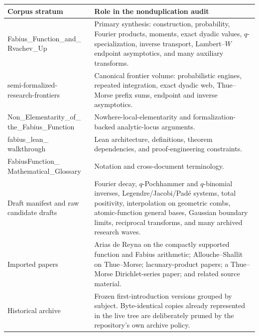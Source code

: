 \documentclass[11pt]{article}
\numberwithin{equation}{section}
\theoremstyle{definition}
\begin{document}
\begin{longtable}{@{}p{}p{}@{}}
\toprule
Corpus stratum & Role in the nonduplication audit\\
\midrule
\endhead
\shortstack[l]{\ttfamily\footnotesize Fabius\_Function\_and\_\\\ttfamily\footnotesize Rvachev\_Up} & Primary synthesis: construction, probability, Fourier products, moments, exact dyadic values, \(q\)-specialization, inverse transport, Lambert--\(W\) endpoint asymptotics, and many auxiliary transforms.\\
\shortstack[l]{\ttfamily\footnotesize semi-formalized-\\\ttfamily\footnotesize research-frontiers} & Canonical frontier volume: probabilistic engines, repeated integration, exact dyadic web, Thue--Morse prefix sums, endpoint and inverse asymptotics.\\
\shortstack[l]{\ttfamily\footnotesize Non\_Elementarity\_of\_\\\ttfamily\footnotesize the\_Fabius\_Function} & Nowhere-local-elementarity and formalization-backed analytic-locus arguments.\\
\shortstack[l]{\ttfamily\footnotesize fabius\_lean\_\\\ttfamily\footnotesize walkthrough} & Lean architecture, definitions, theorem dependencies, and proof-engineering constraints.\\
\shortstack[l]{\ttfamily\footnotesize FabiusFunction\_\\\ttfamily\footnotesize Mathematical\_Glossary} & Notation and cross-document terminology.\\
Draft manifest and raw candidate drafts & Fourier decay, \(q\)-Pochhammer and \(q\)-binomial inverses, Legendre/Jacobi/Pad\'e systems, total positivity, interpolation on geometric combs, atomic-function general bases, Gaussian boundary limits, reciprocal transforms, and many archived research waves.\\
Imported papers & Arias de Reyna on the compactly supported function and Fabius arithmetic; Allouche--Shallit on Thue--Morse; lacunary-product papers; a Thue--Morse Dirichlet-series paper; and related source material.\\
Historical archive & Frozen first-introduction versions grouped by subject.  Byte-identical copies already represented in the live tree are deliberately pruned by the repository's own archive policy.\\
\bottomrule
\end{longtable}
\end{document}
